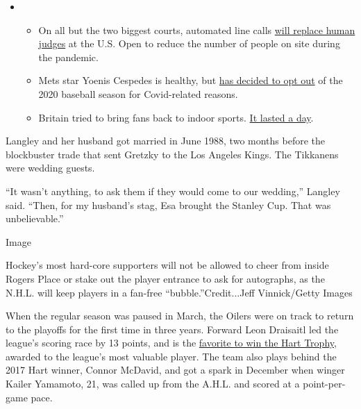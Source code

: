 \begin{itemize}
\item
  \begin{itemize}
  \tightlist
  \item
    On all but the two biggest courts, automated line calls
    \href{https://www.nytimes.com/2020/08/03/sports/tennis/us-open-hawkeye-line-judges.html?action=click\&pgtype=Article\&state=default\&region=MAIN_CONTENT_2\&context=storylines_keepup}{will
    replace human judges} at the U.S. Open to reduce the number of
    people on site during the pandemic.
  \item
    Mets star Yoenis Cespedes is healthy, but
    \href{https://www.nytimes.com/2020/08/02/sports/baseball/Yoenis-cespedes-opt-out-rule.html?action=click\&pgtype=Article\&state=default\&region=MAIN_CONTENT_2\&context=storylines_keepup}{has
    decided to opt out} of the 2020 baseball season for Covid-related
    reasons.
  \item
    Britain tried to bring fans back to indoor sports.
    \href{https://www.nytimes.com/2020/08/02/sports/snooker-world-championship.html?action=click\&pgtype=Article\&state=default\&region=MAIN_CONTENT_2\&context=storylines_keepup}{It
    lasted a day}.
  \end{itemize}
\end{itemize}

Langley and her husband got married in June 1988, two months before the
blockbuster trade that sent Gretzky to the Los Angeles Kings. The
Tikkanens were wedding guests.

``It wasn't anything, to ask them if they would come to our wedding,''
Langley said. ``Then, for my husband's stag, Esa brought the Stanley
Cup. That was unbelievable.''

Image

Hockey's most hard-core supporters will not be allowed to cheer from
inside Rogers Place or stake out the player entrance to ask for
autographs, as the N.H.L. will keep players in a fan-free
``bubble.''Credit...Jeff Vinnick/Getty Images

When the regular season was paused in March, the Oilers were on track to
return to the playoffs for the first time in three years. Forward Leon
Draisaitl led the league's scoring race by 13 points, and is the
\href{https://www.nytimes.com/2020/07/27/sports/hockey/nhl-awards-restart-postseason.html}{favorite
to win the Hart Trophy,} awarded to the league's most valuable player.
The team also plays behind the 2017 Hart winner, Connor McDavid, and got
a spark in December when winger Kailer Yamamoto, 21, was called up from
the A.H.L. and scored at a point-per-game pace.

